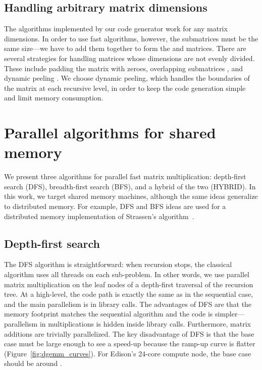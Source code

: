 \documentclass[preprint]{sigplanconf}
\begin{document}
\subsection{Handling arbitrary matrix dimensions}
\label{sec:all_dimensions}

The algorithms implemented by our code generator work for any matrix dimensions.
In order to use fast algorithms, however, the submatrices must be the same size---we have to add them together to form the  and  matrices.
There are several strategies for handling matrices whose dimensions are not evenly divided.
These include padding the matrix with zeroes, overlapping submatrices \cite{douglas1994gemmw}, and dynamic peeling \cite{thottethodi1998tuning}.
We choose dynamic peeling, which handles the boundaries of the matrix at each recursive level, in order to keep the code generation simple and limit memory consumption.

\section{Parallel algorithms for shared memory}
\label{sec:parallel}

We present three algorithms for parallel fast matrix multiplication: depth-first search (DFS), breadth-first search (BFS), and a hybrid of the two (HYBRID).
In this work, we target shared memory machines, although the same ideas generalize to distributed memory.
For example, DFS and BFS ideas are used for a distributed memory implementation of Strassen's algorithm~\cite{lipshitz2012communication}.

\subsection{Depth-first search}
\label{sec:par_dfs}

The DFS algorithm is straightforward: when recursion stops, the classical algorithm uses all threads on each sub-problem.
In other words, we use parallel matrix multiplication on the leaf nodes of a depth-first traversal of the recursion tree.
At a high-level, the code path is exactly the same as in the sequential case, and the main parallelism is in library calls.
The advantages of DFS are that the memory footprint matches the sequential algorithm and the code is simpler---parallelism in multiplications is hidden inside library calls.
Furthermore, matrix additions are trivially parallelized.
The key disadvantage of DFS is that the base case must be large enough to see a speed-up because the ramp-up curve is flatter (Figure~\ref{fig:dgemm_curves}).
For Edison's 24-core compute node, the base case should be around .
\end{document}
